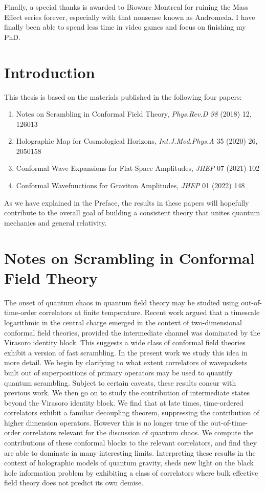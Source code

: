 \documentclass{brownthesis}
\begin{document}
Finally, a special thanks is awarded to Bioware Montreal for ruining the Mass Effect series forever, especially with that nonsense known as Andromeda. I have finally been able to spend less time in video games and focus on finishing my PhD.
\afterpreface

\chapter{Introduction}
This thesis is based on the materials published in the following four papers:
\begin{enumerate}
  \item{Notes on Scrambling in Conformal Field Theory, {\sl Phys.Rev.D 98} (2018) 12, 126013}
  \item{Holographic Map for Cosmological Horizons, {\sl Int.J.Mod.Phys.A} 35 (2020) 26, 2050158}
  \item{Conformal Wave Expansions for Flat Space Amplitudes, {\sl JHEP} 07 (2021) 102}
  \item{Conformal Wavefunctions for Graviton Amplitudes, {\sl JHEP} 01 (2022) 148}
\end{enumerate}
As we have explained in the Preface, the results in these papers will hopefully contribute to
the overall goal of building a consistent theory that unites quantum mechanics and general
relativity.

\chapter{Notes on Scrambling in Conformal Field Theory}\label{chap:chaos}
The onset of quantum chaos in quantum field theory may be studied
using out-of-time-order correlators at finite temperature. Recent
work argued that a timescale logarithmic in the central charge emerged
in the context of two-dimensional conformal field theories, provided
the intermediate channel was dominated by the Virasoro identity block.
This suggests a wide class of conformal field theories exhibit a version
of fast scrambling. In the present work we study this idea in more
detail. We begin by clarifying to what extent correlators of wavepackets
built out of superpositions of primary operators may be used to quantify
quantum scrambling. Subject to certain caveats, these results concur
with previous work. We then go on to study the contribution of intermediate
states beyond the Virasoro identity block. We find that at late times,
time-ordered correlators exhibit a familiar decoupling theorem, suppressing
the contribution of higher dimension operators. However this is no
longer true of the out-of-time-order correlators relevant for the
discussion of quantum chaos. We compute the contributions of these
conformal blocks to the relevant correlators, and find they are able
to dominate in many interesting limits. Interpreting these results
in the context of holographic models of quantum gravity, sheds new
light on the black hole information problem by exhibiting a class
of correlators where bulk effective field theory does not predict
its own demise.
\end{document}
